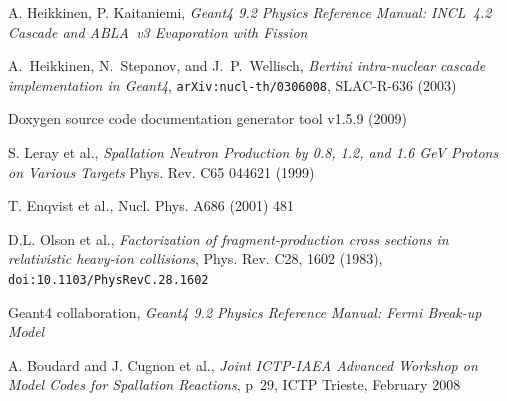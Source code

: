 \documentclass[a4paper]{jpconf}
\begin{document}
\begin{thebibliography}{9}
 A. Heikkinen, P. Kaitaniemi, \emph{Geant4 9.2 Physics Reference Manual: INCL~4.2 Cascade and ABLA~v3 Evaporation with Fission} 

 A.~Heikkinen, N.~Stepanov, and J.~P.~Wellisch,
\emph{Bertini intra-nuclear cascade implementation in Geant4},
{\tt arXiv:nucl-th/0306008}, SLAC-R-636 (2003)

 Doxygen source code documentation generator tool v1.5.9 (2009)

 S. Leray et al., \emph{Spallation Neutron Production by
  0.8, 1.2, and 1.6 GeV Protons on Various Targets} Phys. Rev. C65 044621 (1999)


 T. Enqvist et al., %
Nucl. Phys. A686 (2001) 481

D.L. Olson et al.,
{\em Factorization of fragment-production cross sections in relativistic heavy-ion collisions},
Phys. Rev. C28, 1602 (1983), {\tt doi:10.1103/PhysRevC.28.1602}



 Geant4 collaboration, \emph{Geant4 9.2 Physics Reference Manual: Fermi Break-up Model} 

 A. Boudard and J. Cugnon et al., \emph{Joint ICTP-IAEA Advanced Workshop on Model Codes for Spallation Reactions}, p~29, ICTP Trieste, February 2008


\end{thebibliography}
\end{document}
